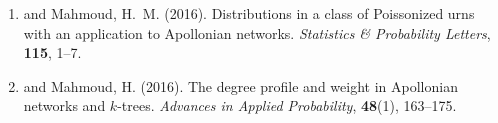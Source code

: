 \begin{enumerate}[resume=journalpubs]

\item\begin{pubentry} \PZ{} and Mahmoud, H.\ M. (2016). Distributions in a class of Poissonized urns with an application to Apollonian networks. \emph{Statistics \& Probability Letters}, \textbf{115}, 1--7.

\par\end{pubentry}
\item\begin{pubentry} \PZ{} and Mahmoud, H. (2016). The degree profile and weight in Apollonian networks and $k$-trees. \emph{Advances in Applied Probability}, \textbf{48}(1), 163--175.
\par\end{pubentry}
\end{enumerate}
